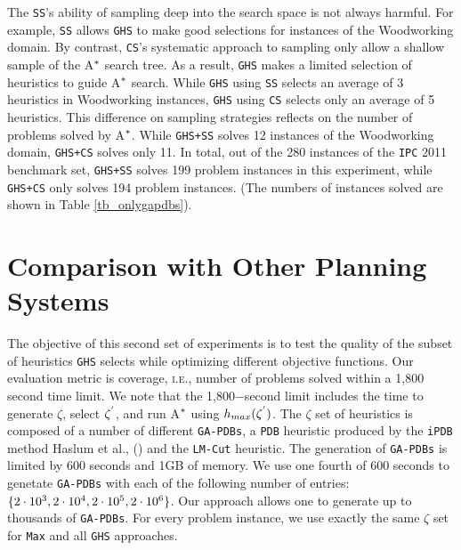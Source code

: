 The \texttt{SS}'s ability of sampling deep into the search space is not always harmful. For example, \texttt{SS} allows \texttt{GHS} to make good selections for instances of the Woodworking domain. By contrast, \texttt{CS}'s systematic approach to sampling only allow a shallow sample of the A$\sp{*}$ search tree. As a result, \texttt{GHS} makes a limited selection of heuristics to guide A$\sp{*}$ search. While \texttt{GHS} using \texttt{SS} selects an average of 3 heuristics in Woodworking instances, \texttt{GHS} using \texttt{CS} selects only an average of 5 heuristics. This difference on sampling strategies reflects on the number of problems solved by A$\sp{*}$. While \texttt{GHS+SS} solves 12 instances of the Woodworking domain, \texttt{GHS+CS} solves only 11. In total, out of the 280 instances of the \texttt{IPC} 2011 benchmark set, \texttt{GHS+SS} solves 199 problem instances in this experiment, while \texttt{GHS+CS} only solves 194 problem instances. (The numbers of instances solved are shown in Table \ref{tb_onlygapdbs}).

\section{Comparison with Other Planning Systems}
\noindent
The objective of this second set of experiments is to test the quality of the subset of heuristics \texttt{GHS} selects while optimizing different objective functions. Our evaluation metric is coverage, \textsc{i.e.,} number of problems solved within a 1,800 second time limit. We note that the 1,800$-$second limit includes the time to generate $\zeta$, select $\zeta\sp{'}$, and run A$\sp{*}$ using $h_{max}(\zeta\sp{'})$. The $\zeta$ set of heuristics is composed of a number of different \texttt{GA-PDBs}, a \texttt{PDB} heuristic produced by the \texttt{iPDB} method Haslum et al., (\citeyear{haslum2007domain}) and the \texttt{LM-Cut} heuristic. The generation of \texttt{GA-PDBs} is limited by 600 seconds and 1GB of memory. We use one fourth of 600 seconds to genetate \texttt{GA-PDBs} with each of the following number of entries: $\{2 \cdot 10\sp{3}, 2 \cdot 10\sp{4}, 2 \cdot 10\sp{5}, 2 \cdot 10\sp{6}\}$. Our approach allows one to generate up to thousands of \texttt{GA-PDBs}. For every problem instance, we use exactly the same $\zeta$ set for \texttt{Max} and all \texttt{GHS} approaches.

